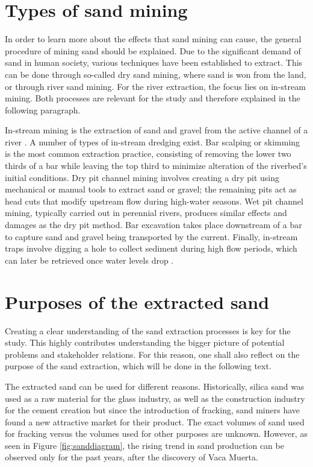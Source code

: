 \section{Types of sand mining}
In order to learn more about the effects that sand mining can cause, the general procedure of mining sand should be explained. Due to the significant demand of sand in human society, various techniques have been established to extract. This can be done through so-called dry sand mining, where sand is won from the land, or through river sand mining. For the river extraction, the focus lies on in-stream mining. Both processes are relevant for the study and therefore explained in the following paragraph.

In-stream mining is the extraction of sand and gravel from the active channel of a river \autocite{sand-mining-boek}. A number of types of in-stream dredging exist. Bar scalping or skimming is the most common extraction practice, consisting of removing the lower two thirds of a bar while leaving the top third to minimize alteration of the riverbed’s initial conditions. Dry pit channel mining involves creating a dry pit using mechanical or manual tools to extract sand or gravel; the remaining pits act as head cuts that modify upstream flow during high-water seasons. Wet pit channel mining, typically carried out in perennial rivers, produces similar effects and damages as the dry pit method. Bar excavation takes place downstream of a bar to capture sand and gravel being transported by the current. Finally, in-stream traps involve digging a hole to collect sediment during high flow periods, which can later be retrieved once water levels drop \autocite{sand-mining-boek}.

\section{Purposes of the extracted sand}
Creating a clear understanding of the sand extraction processes is key for the study. This highly contributes understanding the bigger picture of potential problems and stakeholder relations. For this reason, one shall also reflect on the purpose of the sand extraction, which will be done in the following text. 

The extracted sand can be used for different reasons. Historically, silica sand was used as a raw material for the glass industry, as well as the construction industry for the cement creation but since the introduction of fracking, sand miners have found a new attractive market for their product. The exact volumes of sand used for fracking versus the volumes used for other purposes are unknown. However, as seen in Figure \ref{fig:sanddiagram}, the rising trend in sand production can be observed only for the past years, after the discovery of Vaca Muerta.

